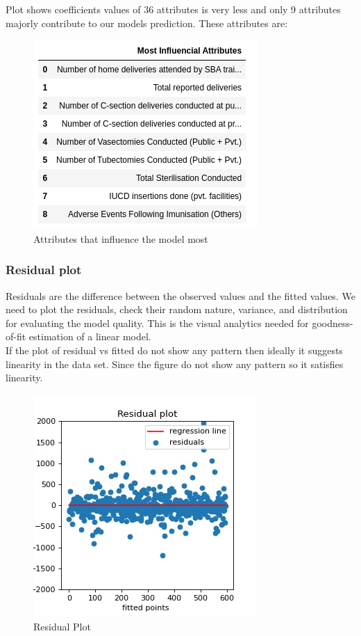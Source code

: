 \documentclass[12pt]{article}
\begin{document}
Plot shows coefficients values of 36 attributes is very less and only 9 attributes majorly contribute to our models prediction. These attributes are:\\
\begin{figure}[h]
\centering
\includegraphics[scale=.7]{images/death/attr_deathlinear.png}
\caption{Attributes that influence the model most}
\end{figure}

\subsubsection{Residual plot}
Residuals are the difference between the observed values and the fitted values. We need to plot the residuals, check their random nature, variance, and distribution for evaluating the model quality. This is the visual analytics needed for goodness-of-fit estimation of a linear model.\\

If the plot of residual vs fitted do not show any pattern then ideally it suggests linearity in the data set. Since the figure do not show any pattern so it satisfies linearity.\\
\begin{figure}[h]
\centering
\includegraphics[scale=.9]{images/death/death-residual-plot.jpg}
\caption{Residual Plot}
\end{figure}
\end{document}
